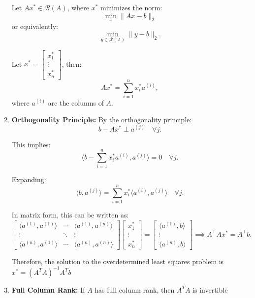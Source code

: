 \begin{derivation}
\begin{enumerate}
    Let $A x^* \in \mathcal{R}(A)$, where $x^*$ minimizes the norm:
    \[
    \min_x \|A x - b\|_2
    \]
    or equivalently:
    \[
    \min_{y \in \mathcal{R}(A)} \|y - b\|_2.
    \]

    Let $x^* = \begin{bmatrix} x_1^* \\ \vdots \\ x_n^* \end{bmatrix}$, then:
    \[
    A x^* = \sum_{i=1}^n x_i^* a^{(i)},
    \]
    where $a^{(i)}$ are the columns of $A$. \\

    \item \textbf{Orthogonality Principle:} By the orthogonality principle:
    \[
    b - A x^* \perp a^{(j)} \quad \forall j.
    \]

    This implies:
    \[
    \langle b - \sum_{i=1}^n x_i^* a^{(i)}, a^{(j)} \rangle = 0 \quad \forall j.
    \]

    Expanding:
    \[
    \langle b, a^{(j)} \rangle = \sum_{i=1}^n x_i^* \langle a^{(i)}, a^{(j)} \rangle \quad \forall j.
    \]

    In matrix form, this can be written as:
    \[
    \begin{bmatrix}
    \langle a^{(1)}, a^{(1)} \rangle & \cdots & \langle a^{(1)}, a^{(n)} \rangle \\
    \vdots & \ddots & \vdots \\
    \langle a^{(n)}, a^{(1)} \rangle & \cdots & \langle a^{(n)}, a^{(n)} \rangle
    \end{bmatrix}
    \begin{bmatrix}
    x_1^* \\
    \vdots \\
    x_n^*
    \end{bmatrix}
    =
    \begin{bmatrix}
    \langle a^{(1)}, b \rangle \\
    \vdots \\
    \langle a^{(n)}, b \rangle
    \end{bmatrix} \implies A^\top A x^* = A^\top b.
    \]

    Therefore, the solution to the overdetermined least squares problem is $x^* = (A^T A)^{-1} A^T b$

    \item \textbf{Full Column Rank:} If $A$ has full column rank, then $A^T A$ is invertible


\end{enumerate}
\end{derivation}

